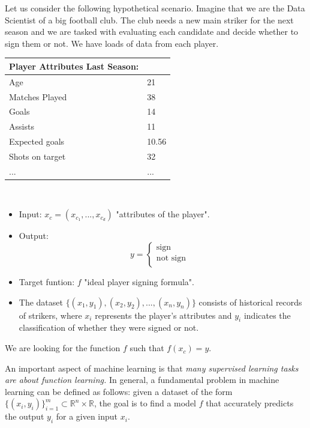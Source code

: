 \documentclass[../main.tex]{subfiles}
\begin{document}
	\begin{xmpl}
	
	Let us consider the following hypothetical scenario.  Imagine that we are the Data Scientist of a big football club. The club needs a new main striker for the next season and we are tasked with evaluating each candidate and decide whether to sign them or not. We have loads of data from each player. \\ 
	
	\begin{tabular}{ll}
		\toprule
		\textbf{Player Attributes Last Season:}  \\ 
		\midrule
		Age & 21 \\
		Matches Played & 38 \\
		Goals& 14\\
		Assists & 11\\
		Expected goals & 10.56 \\
		Shots on target& 32 \\
		... & ... \\
		\bottomrule
	\end{tabular} 
	\\ 
	\begin{itemize}
		\item Input: \textbf{$x_c=(x_{c_1},...,x_{c_d})$}  "attributes of the player". 
		\item Output:  
		\[
		y = \begin{cases}
			\text{sign} \\
			\text{not sign}& \\
		\end{cases}
		\]
		
		\item Target funtion: $f$  "ideal player signing formula".
		\item The dataset $\{(x_1, y_1), (x_2, y_2), ..., (x_n, y_n)\}$ consists of historical records of strikers, where $x_i$ represents the player's attributes and $y_i$ indicates the classification of whether they were signed or not.
	\end{itemize}
	
	\noindent We are looking for the function $f$ such that $f(x_c)=y$.
	\end{xmpl}
	\noindent 
	An important aspect of machine learning is that \textit{many supervised learning tasks are about function learning.} In general, a fundamental problem in machine learning can be defined as follows: given a dataset of the form $\{(x_i,y_i)\}^m_{i=1} \subset \mathbb{R}^n \times \mathbb{R}$, the goal is to find a model $f$ that accurately predicts the output $y_i$ for a given input $x_i$.
	
\end{document}
